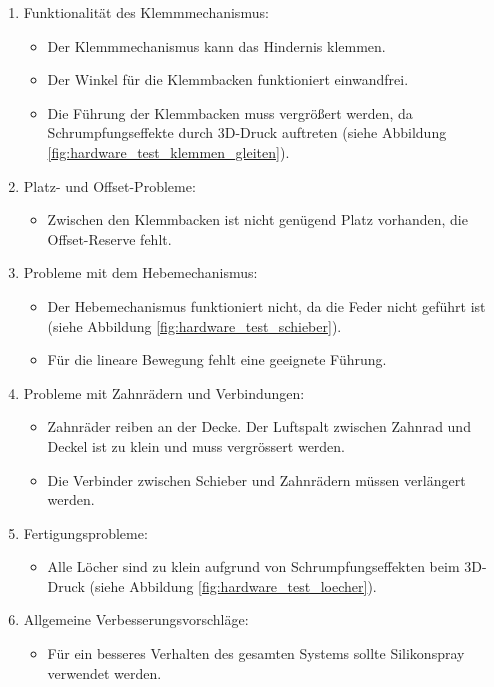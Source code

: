 \documentclass[../main.tex]{subfiles}
\begin{document}
\begin{enumerate}
    \item Funktionalität des Klemmmechanismus:
    \begin{itemize}
        \item Der Klemmmechanismus kann das Hindernis klemmen.
        \item Der Winkel für die Klemmbacken funktioniert einwandfrei.
        \item Die Führung der Klemmbacken muss vergrößert werden, da Schrumpfungseffekte durch 3D-Druck auftreten (siehe Abbildung \ref{fig:hardware_test_klemmen_gleiten}).
    \end{itemize}
    \item Platz- und Offset-Probleme:
    \begin{itemize}
        \item Zwischen den Klemmbacken ist nicht genügend Platz vorhanden, die Offset-Reserve fehlt.
    \end{itemize}
    \item Probleme mit dem Hebemechanismus:
    \begin{itemize}
        \item Der Hebemechanismus funktioniert nicht, da die Feder nicht geführt ist (siehe Abbildung \ref{fig:hardware_test_schieber}).
        \item Für die lineare Bewegung fehlt eine geeignete Führung.
    \end{itemize}
    \item Probleme mit Zahnrädern und Verbindungen:
    \begin{itemize}
        \item Zahnräder reiben an der Decke. Der Luftspalt zwischen Zahnrad und Deckel ist zu klein und muss vergrössert werden.
        \item Die Verbinder zwischen Schieber und Zahnrädern müssen verlängert werden.
    \end{itemize}
    \item Fertigungsprobleme:
    \begin{itemize}
        \item Alle Löcher sind zu klein aufgrund von Schrumpfungseffekten beim 3D-Druck (siehe Abbildung \ref{fig:hardware_test_loecher}).
    \end{itemize}
    \item Allgemeine Verbesserungsvorschläge:
    \begin{itemize}
        \item Für ein besseres Verhalten des gesamten Systems sollte Silikonspray verwendet werden.
    \end{itemize}
\end{enumerate}
\end{document}
